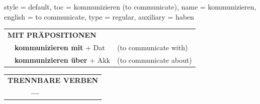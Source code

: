 \begin{verbentry}{
  style = {default},
  toc = {kommunizieren (to communicate)},
  name = {kommunizieren},
  english = {to communicate},
  type = {regular},
  auxiliary = {haben}
}
\vspace{10pt}

\begin{tabular}{lll}
\multicolumn{3}{l}{\textbf{MIT PRÄPOSITIONEN}}\\
& \textbf{kommunizieren mit} + Dat & (to communicate with)\\
& \textbf{kommunizieren über} + Akk & (to communicate about)\\
\end{tabular}
\hfill
\begin{tabular}{lll}
\multicolumn{3}{l}{\textbf{TRENNBARE VERBEN}}\\
& \textbf{---} & \\
\end{tabular}

\vspace{-5pt}
\end{verbentry}

